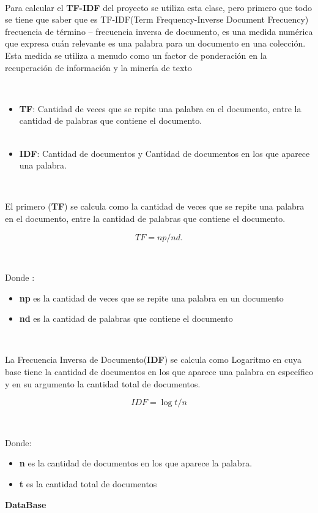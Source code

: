 \documentclass{article}
\begin{document}
{\

Para calcular el \textbf{TF-IDF} del proyecto se utiliza esta clase, pero primero que todo se tiene que saber que es TF-IDF(Term Frequency-Inverse Document Frecuency) frecuencia de término – frecuencia inversa de documento, 
es una medida numérica que expresa cuán relevante es una palabra para un documento en una colección.
Esta medida se utiliza a menudo como un factor de ponderación en la recuperación de información y la minería de texto

\

\begin{itemize}
\item\textbf{TF}: Cantidad de veces que se repite una palabra en el documento, entre la cantidad de palabras que contiene el documento. \\
\
\item\textbf{IDF}: Cantidad de documentos y Cantidad de documentos en los que aparece  una palabra.\\
\end{itemize}

\

El primero (\textbf{TF}) se calcula como  la cantidad de veces que se repite una palabra en el documento, entre la cantidad de palabras que contiene el documento.

\begin{equation*}
    TF = np / nd .
\end{equation*}

\

Donde :
\
\begin{itemize}
    \item\textbf{np} es la cantidad de veces que se repite una palabra en un documento\\
    \item\textbf{nd} es la cantidad de palabras que contiene el documento 
\\
\end{itemize}

\

La Frecuencia Inversa de Documento(\textbf{IDF}) se calcula como  Logaritmo en cuya base tiene la cantidad de documentos en los que aparece una palabra en específico y en su argumento la cantidad total  de documentos. 

\begin{equation*}
    IDF = \log{t/n}
\end{equation*}

\

Donde:
\\
\begin{itemize}
    \item\textbf{n} es la cantidad de documentos en los que aparece la palabra.
    \item\textbf{t} es la cantidad total de documentos  
\end{itemize}
\pagebreak
\textbf{\large DataBase }

}
\end{document}
